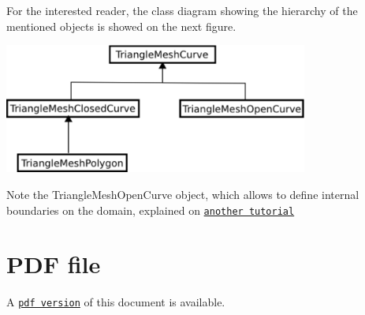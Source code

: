 For the interested reader, the class diagram showing the hierarchy of the mentioned objects is showed on the next figure.

 
\begin{DoxyImage}
\includegraphics[width=0.75\textwidth]{class_diagram}
\end{DoxyImage}


Note the {\ttfamily Triangle\+Mesh\+Open\+Curve} object, which allows to define internal boundaries on the domain, explained on \href{../../../../doc/meshes/mesh_from_inline_triangle_internal_boundaries/html/index.html}{\tt another tutorial}



 

 \hypertarget{index_pdf}{}\section{P\+D\+F file}\label{index_pdf}
A \href{../latex/refman.pdf}{\tt pdf version} of this document is available. 
